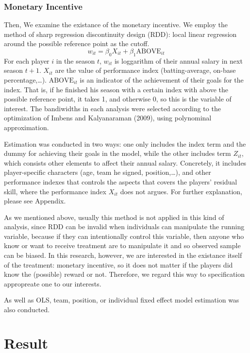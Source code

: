 \documentclass[dvipdfmx, 12pt]{article}
\begin{document}
  \subsubsection{Monetary Incentive}

  Then, We examine the existance of the monetary incentive. We employ the method of sharp regression discontinuity design (RDD): local linear regression around the possible reference point as the cutoff.
  \[
  w_{it} = \beta_0 X_{it} + \beta_1 \text{ABOVE}_{it}
  \]
  For each player $i$ in the season $t$, $w_{it}$ is loggarithm of their annual salary in next season $t+1$. $X_{it}$ are the value of performance index (batting-average, on-base percentage,\ldots). $\text{ABOVE}_{it}$ is an indicator of the achievement of their goals for the index. That is, if he finished his season with a certain index with above the possible reference point, it takes 1, and otherwise 0, so this is the variable of interest. The bandiwidths in each analysis were selected according to the optimization of Imbens and Kalyanaraman (2009), using polynominal approximation.

  Estimation was conducted in two ways: one only includes the index term and the dummy for achieving their goals in the model, while the other includes term $Z_{it}$, which consists other elements to affect their annual salary. Concretely, it includes player-specific characters (age, team he signed, position,\ldots), and other performance indexes that controls the aspects that covers the players' residual skill, where the performance index $X_{it}$ does not argues. For further explanation, please see Appendix.

  As we mentioned above, usually this method is not applied in this kind of analysis, since RDD can be invalid when individuals can manipulate the running variable, because if they can intentionally control this variable, then anyone who know or want to receive treatment are to manipulate it and so observed sample can be biased. In this research, however, we are interested in the existance itself of the treatment: monetary incentive, so it does not matter if the players did know the (possible) reward or not. Therefore, we regard this way to specification appropreate one to our interests.

  As well as OLS, team, position, or individual fixed effect model estimation was also conducted.


\section{Result}
\end{document}
